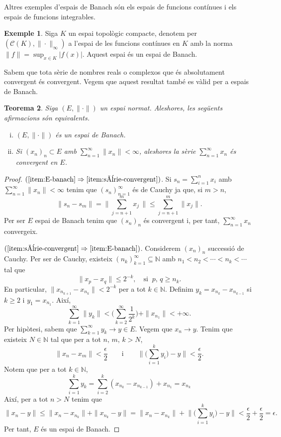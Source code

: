 \documentclass[12pt]{book}
\newtheorem{teorema}{Teorema}[chapter]
\theoremstyle{definition}
\theoremstyle{nota}
\theoremstyle{exemple}
\newtheorem{exemple}[teorema]{Exemple}
\begin{document}
Altres exemples d'espais de Banach són els espais de funcions
contínues i els espais de funcions integrables.

\begin{exemple}
  Siga $K$ un espai topològic compacte, denotem per
  $(\mathcal{C}(K), \|\cdot\|_\infty)$ a l'espai de les funcions
  contínues en $K$ amb la norma $\|f\| = \sup_{x \in K}
  |f(x)|$. Aquest espai és un espai de Banach.
\end{exemple}

Sabem que tota sèrie de nombres reals o complexos que és absolutament
convergent és convergent. Vegem que aquest resultat també es vàlid per
a espais de Banach.

\begin{teorema}
  Siga $(E, \|\cdot\|)$ un espai normat. Aleshores, les següents
  afirmacions són equivalents.
  \begin{enumerate}[(i), nosep]
  \item\label{item:E-banach} $(E, \|\cdot\|)$ és un espai de Banach.
  \item\label{item:sèrie-convergent} Si $(x_n)_n \subset E$ amb
    $\sum_{n=1}^{\infty} \|x_n\| < \infty$, aleshores la sèrie
    $\sum_{n=1}^{\infty} x_n$ és convergent en $E$.
  \end{enumerate}
\end{teorema}

\begin{proof}
  $(\ref{item:E-banach} \Rightarrow \ref{item:sèrie-convergent})$. Si
  $s_n = \sum_{i=1}^{n} x_i$ amb $\sum_{n=1}^{\infty}\|x_n\| < \infty$
  tenim que $(s_n)_{n=1}^\infty$ és de Cauchy ja que, si $m > n$,
  \[
    \|s_n - s_m\| = \Big\| \sum_{j=n+1}^{m} x_j \, \Big\|
    \leq \sum_{j=n+1}^{m} \|x_j\|.
  \]
  Per ser $E$ espai de Banach tenim que $(s_n)_n$ és convergent i, per
  tant, $\sum_{n=1}^{\infty} x_n$ convergeix.

  $(\ref{item:sèrie-convergent} \Rightarrow
  \ref{item:E-banach})$. Considerem $(x_n)_n$ successió de Cauchy. Per
  ser de Cauchy, existeix $(n_k)_{k=1}^\infty \subseteq \mathbb{N}$
  amb $n_1 < n_2 < \dotsb < n_k < \dotsb$ tal que
  \[
    \|x_p - x_q\| \leq 2^{-k}, \quad \text{si} \;\; p,\, q \geq n_k.
  \]
  En particular, $\|x_{n_{k+1}} - x_{n_k}\| < 2^{-k}$ per a tot
  $k \in \mathbb{N}$. Definim $y_k = x_{n_k} - x_{n_{k-1}}$ si
  $k \geq 2$ i $y_1 = x_{n_1}$. Així,
  \[
    \sum_{k=1}^{\infty} \|y_k\| < \Big( \sum_{k=2}^{\infty}
    \frac{1}{2^k} \Big) + \|x_{n_1}\| < + \infty.
  \]
  Per hipòtesi, sabem que $\sum_{k=1}^{\infty} y_k \to y \in E$.
  Vegem que $x_n \to y$. Tenim que existeix $N \in \mathbb{N}$ tal que
  per a tot $n,\, m,\, k > N$,
  \[
    \|x_n - x_m\| < \frac{\epsilon}{2} \qquad \text{i} \qquad \Big\|
    \Big( \sum_{i=1}^{k} y_i \Big) - y \Big\| < \frac{\epsilon}{2}.
  \]
  Notem que per a tot $k \in \mathbb{N}$,
  \[
    \sum_{i=1}^{k} y_k = \sum_{i=2}^{k} (x_{n_k} - x_{n_{k-1}}) + x_{n_1}
    = x_{n_k}
  \]
  Així, per a tot $n > N$ tenim que
  \[
    \|x_n - y\| \leq \|x_n - x_{n_k}\| + \|x_{n_k} - y\| = \|x_n -
    x_{n_k}\| + \Big\| \Big( \sum_{i=1}^{k} y_i \Big) - y \Big\| <
    \frac{\epsilon}{2} + \frac{\epsilon}{2} = \epsilon.
  \]
  Per tant, $E$ és un espai de Banach.
\end{proof}
\end{document}
